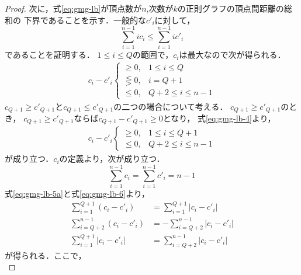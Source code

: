 \begin{proof}
  次に，式\eqref{eq:gmg-lb}が頂点数が$n$,次数が$k$の正則グラフの頂点間距離の総和の
  下界であることを示す．一般的な$c'_i$に対して，
  \begin{equation}
    \label{eq:gmg-lb-3}
    \sum_{i=1}^{n-1}i c_i \leq \sum_{i=1}^{n-1}i c'_i
  \end{equation}
  であることを証明する．
  $1\leq i\leq Q$の範囲で，$c_i$は最大なので次が得られる．
  \begin{equation}
    \label{eq:gmg-lb-4}
    \begin{aligned}
      c_i - c'_i
      \begin{cases}
        \geq 0, & 1\leq i\leq Q \\
        \lesseqgtr 0, & i = Q+1 \\
        \leq 0, & Q+2\leq i\leq n-1
      \end{cases}
    \end{aligned}
  \end{equation}
  $c_{Q+1}\geq c'_{Q+1}$と$c_{Q+1}\leq c'_{Q+1}$の二つの場合について考える．
  $c_{Q+1}\geq c'_{Q+1}$のとき，
  $c_{Q+1}\geq c'_{Q+1}$ならば$c_{Q+1}-c'_{Q+1}\geq0$となり，
  式\eqref{eq:gmg-lb-4}より，
  \begin{equation}
    \label{eq:gmg-lb-5a}
    \begin{aligned}
      c_i-c'_i
      \begin{cases}
        \geq 0, & 1\leq i\leq Q+1 \\
        \leq 0, & Q+2\leq i\leq n-1
      \end{cases}
    \end{aligned}
  \end{equation}
  が成り立つ．$c_i$の定義より，次が成り立つ．
  \begin{equation}
    \label{eq:gmg-lb-6}
    \sum_{i=1}^{n-1}c_i = \sum_{i=1}^{n-1}c'_i = n-1
  \end{equation}
  式\eqref{eq:gmg-lb-5a}と式\eqref{eq:gmg-lb-6}より，
  \begin{equation}
    \label{eq:gmg-lb-7a}
    \begin{aligned}
      \sum_{i=1}^{Q+1}(c_i-c'_i) &= \sum_{i=1}^{Q+1}|c_i-c'_i| \\
      \sum_{i=Q+2}^{n-1}(c_i-c'_i) &= -\sum_{i=Q+2}^{n-1}|c_i-c'_i| \\
      \sum_{i=1}^{Q+1}|c_i-c'_i| &= \sum_{i=Q+2}^{n-1}|c_i-c'_i|
    \end{aligned}
  \end{equation}
  が得られる．ここで，
  \begin{equation}

\end{equation}
\end{proof}

